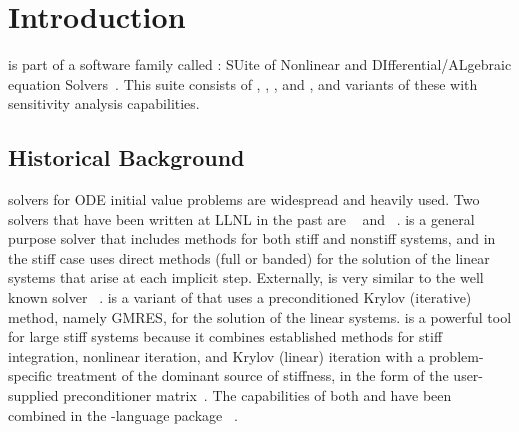 \chapter{Introduction}\label{s:intro}

{\cvode} is part of a software family called {\sundials}: 
SUite of Nonlinear and DIfferential/ALgebraic equation Solvers~\cite{HBGLSSW:05}.  
This suite consists of {\cvode}, {\arkode}, {\kinsol}, and {\ida}, and variants
of these with sensitivity analysis capabilities.
%
\section{Historical Background}\label{ss:history}

{\F} solvers for ODE initial value problems are widespread and heavily used. 
Two solvers that have been written at LLNL in the past are {\vode}~\cite{BBH:89} 
and {\vodpk}~\cite{Byr:92}.
{\vode} is a general purpose solver that includes methods for
both stiff and nonstiff systems, and in the stiff case uses direct methods (full or
banded) for the solution of the linear systems that arise at each implicit
step. Externally, {\vode} is very similar to the well known solver
{\lsode}~\cite{RaHi:94}. {\vodpk}
is a variant of {\vode} that uses a preconditioned Krylov (iterative)
method, namely GMRES, for the solution of the linear systems. {\vodpk}
is a powerful tool for large stiff systems because it combines
established methods for stiff integration, nonlinear iteration, and
Krylov (linear) iteration with a problem-specific treatment of the
dominant source of stiffness, in the form of the user-supplied
preconditioner matrix~\cite{BrHi:89}.  The capabilities of both
{\vode} and {\vodpk} have been combined in the {\CC}-language package
{\cvode}~\cite{CoHi:96}.

